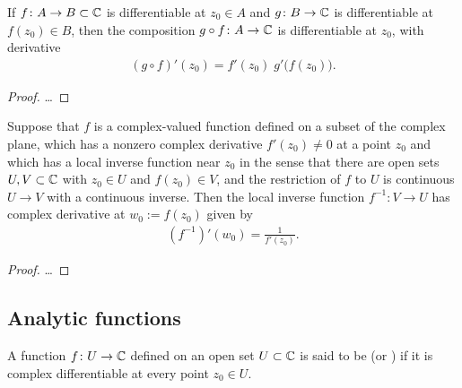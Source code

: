 \begin{lemma}
  \label{lem:chain_rule}
  If $f \colon A \to B \subset \mathbb{C}$ is differentiable at $z_0 \in A$
  and $g \colon B \to \mathbb{C}$ is differentiable at $f(z_0) \in B$,
  then the composition $g \circ f \colon A \to \mathbb{C}$ is differentiable at $z_0$,
  with derivative
  \begin{align*}
    (g \circ f)'(z_0) = f'(z_0) \; g'\big( f(z_0) \big) .
  \end{align*}
\end{lemma}
\begin{proof}
  \ldots
\end{proof}

\begin{lemma}
  \label{lem:inverse_derivative}
  Suppose that $f$ is a complex-valued function defined on a subset of
  the complex plane, which has a nonzero complex derivative $f'(z_0) \ne 0$
  at a point $z_0$ and which has a local inverse function near $z_0$ in the
  sense that there are open sets $U, V \subset \mathbb{C}$ with $z_0 \in U$
  and $f(z_0) \in V$, and the restriction of $f$ to $U$
  is continuous $U \to V$ with a continuous inverse. Then
  the local inverse function $f^{-1} \colon V \to U$ has complex derivative
  at $w_0 := f(z_0)$ given by
  \begin{align*}
    (f^{-1})'(w_0) = \frac{1}{f'(z_0)} .
  \end{align*}
\end{lemma}
\begin{proof}
  \ldots
\end{proof}


\subsection{Analytic functions}

\begin{definition}
  \label{def:analytic_function}
  A function $f \colon U \to \mathbb{C}$ defined on an open set $U \subset \mathbb{C}$ is
  said to be  (or ) if it is complex
  differentiable at every point $z_0 \in U$.
\end{definition}

